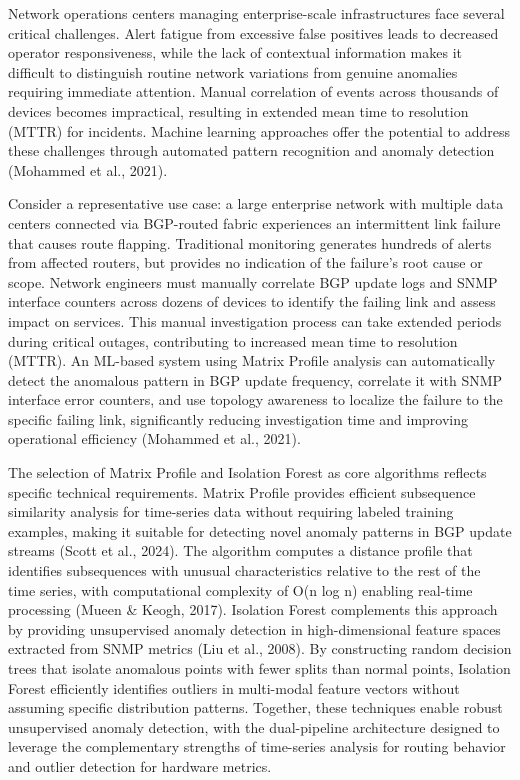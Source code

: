 \documentclass[11pt]{article}
\begin{document}
Network operations centers managing enterprise-scale infrastructures face several critical challenges. Alert fatigue from excessive false positives leads to decreased operator responsiveness, while the lack of contextual information makes it difficult to distinguish routine network variations from genuine anomalies requiring immediate attention. Manual correlation of events across thousands of devices becomes impractical, resulting in extended mean time to resolution (MTTR) for incidents. Machine learning approaches offer the potential to address these challenges through automated pattern recognition and anomaly detection (Mohammed et al., 2021).

Consider a representative use case: a large enterprise network with multiple data centers connected via BGP-routed fabric experiences an intermittent link failure that causes route flapping. Traditional monitoring generates hundreds of alerts from affected routers, but provides no indication of the failure's root cause or scope. Network engineers must manually correlate BGP update logs and SNMP interface counters across dozens of devices to identify the failing link and assess impact on services. This manual investigation process can take extended periods during critical outages, contributing to increased mean time to resolution (MTTR). An ML-based system using Matrix Profile analysis can automatically detect the anomalous pattern in BGP update frequency, correlate it with SNMP interface error counters, and use topology awareness to localize the failure to the specific failing link, significantly reducing investigation time and improving operational efficiency (Mohammed et al., 2021).

The selection of Matrix Profile and Isolation Forest as core algorithms reflects specific technical requirements. Matrix Profile provides efficient subsequence similarity analysis for time-series data without requiring labeled training examples, making it suitable for detecting novel anomaly patterns in BGP update streams (Scott et al., 2024). The algorithm computes a distance profile that identifies subsequences with unusual characteristics relative to the rest of the time series, with computational complexity of O(n log n) enabling real-time processing (Mueen \& Keogh, 2017). Isolation Forest complements this approach by providing unsupervised anomaly detection in high-dimensional feature spaces extracted from SNMP metrics (Liu et al., 2008). By constructing random decision trees that isolate anomalous points with fewer splits than normal points, Isolation Forest efficiently identifies outliers in multi-modal feature vectors without assuming specific distribution patterns. Together, these techniques enable robust unsupervised anomaly detection, with the dual-pipeline architecture designed to leverage the complementary strengths of time-series analysis for routing behavior and outlier detection for hardware metrics.
\end{document}
